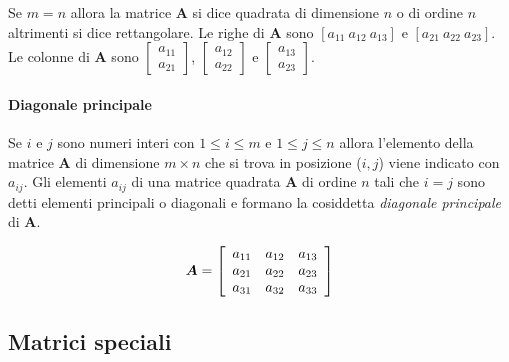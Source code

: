 Se $m = n$ allora la matrice $\boldsymbol{A}$ si dice quadrata di
dimensione $n$ o di ordine $n$ altrimenti si dice rettangolare.
Le righe di $\boldsymbol{A}$ sono $[a_{11}\
a_{12}\ a_{13}]$ e $[a_{21}\ a_{22}\ a_{23}]$.
 Le colonne di $\boldsymbol{A}$ sono $\left[
\begin{array}{c} a_{11} \\ a_{21} \end{array} \right]$, $\left[
\begin{array}{c} a_{12} \\ a_{22} \end{array} \right]$ e $\left[
\begin{array}{c} a_{13} \\ a_{23} \end{array} \right]$.

\paragraph{Diagonale principale}

Se $i$ e $j$ sono numeri interi con $1 \leq i \leq m$ e $1 \leq j
\leq n$ allora l'elemento della matrice $\boldsymbol{A}$ di
dimensione $m \times n$ che si trova in posizione ($i, j$) viene
indicato con $a_{ij}$.
 Gli elementi $a_{ij}$ di una matrice quadrata $\boldsymbol{A}$ di ordine
 $n$ tali che $i = j$ sono detti elementi principali o diagonali e
formano la cosiddetta \emph{diagonale principale} di
$\boldsymbol{A}$.

\begin{displaymath}
\boldsymbol{A} =  \left[ \begin{array}{c c c}
a_{11} & a_{12} & a_{13}\\
a_{21} &  a_{22} & a_{23}\\
a_{31} & a_{32} & a_{33} \end{array} \right]
\end{displaymath}


\subsection{Matrici speciali}

